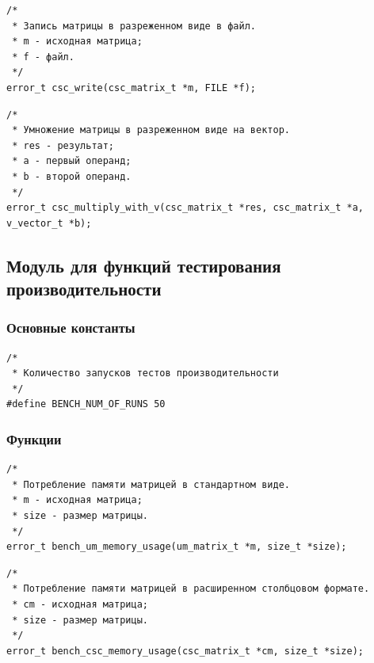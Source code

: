\documentclass[a4paper,12pt]{extarticle}
\begin{document}
 \vspace{0.5cm}


\begin{verbatim}
/*
 * Запись матрицы в разреженном виде в файл.
 * m - исходная матрица;
 * f - файл.
 */
error_t csc_write(csc_matrix_t *m, FILE *f);
\end{verbatim}


 \vspace{0.5cm}


\begin{verbatim}
/*
 * Умножение матрицы в разреженном виде на вектор.
 * res - результат;
 * a - первый операнд;
 * b - второй операнд.
 */
error_t csc_multiply_with_v(csc_matrix_t *res, csc_matrix_t *a, v_vector_t *b);
\end{verbatim}


 \vspace{0.5cm}


\subsection{Модуль для функций тестирования производительности}

\subsubsection{Основные константы}
\begin{verbatim}
/*
 * Количество запусков тестов производительности
 */
#define BENCH_NUM_OF_RUNS 50
\end{verbatim}




\subsubsection{Функции}
\begin{verbatim}
/*
 * Потребление памяти матрицей в стандартном виде.
 * m - исходная матрица;
 * size - размер матрицы.
 */
error_t bench_um_memory_usage(um_matrix_t *m, size_t *size);
\end{verbatim}


 \vspace{0.5cm}

\begin{verbatim}
/*
 * Потребление памяти матрицей в расширенном столбцовом формате.
 * cm - исходная матрица;
 * size - размер матрицы.
 */
error_t bench_csc_memory_usage(csc_matrix_t *cm, size_t *size);
\end{verbatim}
\end{document}
